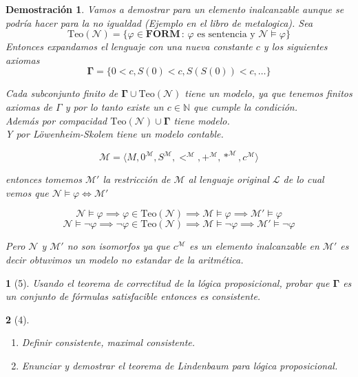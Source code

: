 \documentclass[leqno, 12pt, twoside,letterpaper]{book}
\theoremstyle{plain}
\newtheorem*{dem}{Demostración}
\newtheorem{ej}{}
\theoremstyle{definition}
\newcommand{\set}[2]{\{ #1 \, : \, #2 \}}
\newcommand{\FORM}[0]{\bm{FORM}}
\newcommand{\naturals}[0]{\mathbb{N}}
\newcommand{\TeoN}[0]{\mbox{Teo}(\mathcal{N})}
\newcommand{\ARITH}[0]{\mathcal{N}}
\newcommand{\MODEL}[0]{\mathscr{M}}
\newenvironment{solution}[0]{\begin{adjustwidth}{1.5em}{1.5em}}{\end{adjustwidth}}
\begin{document}
\begin{solution}
\begin{dem}
	Vamos a demostrar para un elemento inalcanzable aunque se podría hacer para la no igualdad (Ejemplo en el libro de metalogica). Sea
	 \[\TeoN = \set{\varphi \in \FORM}{ \varphi \mbox{ es sentencia y } \ARITH \models \varphi}\]
\noindent Entonces expandamos el lenguaje con una nueva constante $c$ y los siguientes axiomas 
 \[ \bm{\Gamma} = \{ 0 < c, S(0) < c, S(S(0)) < c, \dots \} \]
 
\noindent Cada subconjunto finito de $\bm{\Gamma} \cup \TeoN$ tiene un modelo, ya que tenemos finitos axiomas de $\Gamma$ y por lo tanto existe un $c \in \naturals$ que cumple la condición.\\
\noindent Además por compacidad $\TeoN \cup \bm{\Gamma}$ tiene modelo. \\
\noindent Y por Löwenheim-Skolem tiene un modelo contable.
	
	\[ \MODEL = \langle M, 0^{\MODEL}, S^{\MODEL}, <^{\MODEL}, +^{\MODEL}, *^{\MODEL}, c^{\MODEL} \rangle \]

\noindent entonces tomemos $\MODEL'$ la restricción de $\MODEL$ al lenguaje original $\mathcal{L}$ de lo cual vemos que $\ARITH \models \varphi \iff \MODEL' $

\[ \ARITH \models \varphi \implies \varphi \in \TeoN \implies \MODEL \models \varphi \implies \MODEL' \models \varphi \]
\[ \ARITH \models \lnot\varphi \implies \lnot\varphi \in \TeoN \implies \MODEL \models \lnot\varphi \implies \MODEL' \models \lnot\varphi \]

\noindent Pero $\ARITH$ y $\MODEL'$ no son isomorfos ya que $c^{\MODEL}$ es un elemento inalcanzable en $\MODEL'$ es decir obtuvimos un modelo no estandar de la aritmética.

\end{dem}
\end{solution}

\begin{ej}[5]
    Usando el teorema de correctitud de la lógica proposicional, probar que
    $\bm{\Gamma}$ es un conjunto de fórmulas satisfacible entonces es
    consistente.
\end{ej}

\begin{ej}[4]
    \begin{enumerate}
    \item Definir consistente, maximal consistente.
    \item Enunciar y demostrar el teorema de Lindenbaum para lógica proposicional.
    \end{enumerate}
\end{ej}
\end{document}
